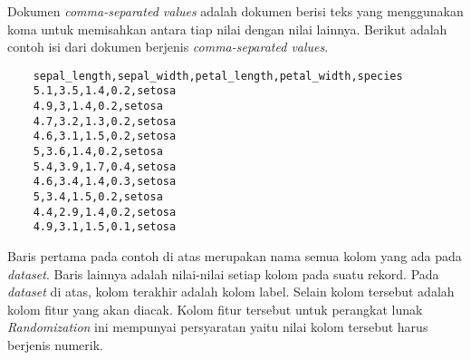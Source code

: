 Dokumen \textit{comma-separated values} adalah dokumen berisi teks yang menggunakan koma untuk memisahkan antara tiap nilai dengan nilai lainnya. Berikut adalah contoh isi dari dokumen berjenis \textit{comma-separated values}.
\begin{verbatim}
	sepal_length,sepal_width,petal_length,petal_width,species
	5.1,3.5,1.4,0.2,setosa
	4.9,3,1.4,0.2,setosa
	4.7,3.2,1.3,0.2,setosa
	4.6,3.1,1.5,0.2,setosa
	5,3.6,1.4,0.2,setosa
	5.4,3.9,1.7,0.4,setosa
	4.6,3.4,1.4,0.3,setosa
	5,3.4,1.5,0.2,setosa
	4.4,2.9,1.4,0.2,setosa
	4.9,3.1,1.5,0.1,setosa
\end{verbatim}
Baris pertama pada contoh di atas merupakan nama semua kolom yang ada pada \textit{dataset}. Baris lainnya adalah nilai-nilai setiap kolom pada suatu rekord. Pada \textit{dataset} di atas, kolom terakhir adalah kolom label. Selain kolom tersebut adalah kolom fitur yang akan diacak. Kolom fitur tersebut untuk perangkat lunak \textit{Randomization} ini mempunyai persyaratan yaitu nilai kolom tersebut harus berjenis numerik.

